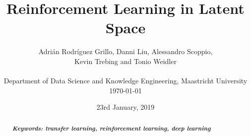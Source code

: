 \documentclass[10pt,a4paper]{article}
\title{Reinforcement Learning in Latent Space}
\date{23rd January, 2019}
\author{\normalfont Adrián Rodríguez Grillo, Danni Liu, Alessandro Scoppio,\\Kevin Trebing and Tonio Weidler\\\\
Department of Data Science and Knowledge Engineering, Maastricht University\\\today}
\begin{document}
\maketitle

\begin{abstract}

{{\it \bf Keywords: transfer learning, reinforcement learning, deep learning}}
\end{abstract}









{\tiny\printbibliography}

\clearpage
\raggedbottom
\appendix
\begin{appendix}
\end{appendix}
\end{document}
